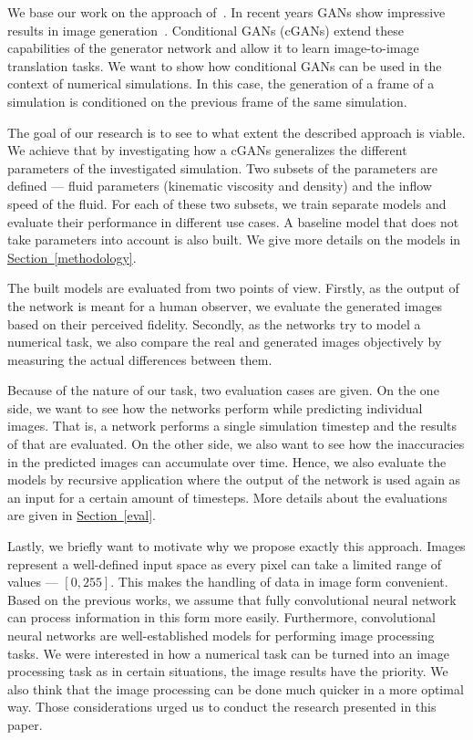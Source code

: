 \documentclass{llncs}
\newcommand{\refsec}[1]{\hyperref[#1]{Section~\ref*{#1}}}
\begin{document}
We base our work on the approach of~\cite{pix2pix}. In recent years GANs show impressive results in image generation~\cite{DashGALA17,ZhangXLZHWM16,karras2017progressive}. Conditional GANs (cGANs) extend these capabilities of the generator network and allow it to learn image-to-image translation tasks. We want to show how conditional GANs can be used in the context of numerical simulations. In this case, the generation of a frame of a simulation is conditioned on the previous frame of the same simulation.

The goal of our research is to see to what extent the described approach is viable. We achieve that by investigating how a cGANs generalizes the different parameters of the investigated simulation. Two subsets of the parameters are defined --- fluid parameters (kinematic viscosity and density) and the inflow speed of the fluid. For each of these two subsets, we train separate models and evaluate their performance in different use cases. A baseline model that does not take parameters into account is also built. We give more details on the models in \refsec{methodology}.

The built models are evaluated from two points of view. Firstly, as the output of the network is meant for a human observer, we evaluate the generated images based on their perceived fidelity. Secondly, as the networks try to model a numerical task, we also compare the real and generated images objectively by measuring the actual differences between them.

Because of the nature of our task, two evaluation cases are given. On the one side, we want to see how the networks perform while predicting individual images. That is, a network performs a single simulation timestep and the results of that are evaluated. On the other side, we also want to see how the inaccuracies in the predicted images can accumulate over time. Hence, we also evaluate the models by recursive application where the output of the network is used again as an input for a certain amount of timesteps. More details about the evaluations are given in \refsec{eval}.

Lastly, we briefly want to motivate why we propose exactly this approach. Images represent a well-defined input space as every pixel can take a limited range of values --- $[0, 255]$. This makes the handling of data in image form convenient. Based on the previous works, we assume that fully convolutional neural network can process information in this form more easily. Furthermore, convolutional neural networks are well-established models for performing image processing tasks. We were interested in how a numerical task can be turned into an image processing task as in certain situations, the image results have the priority. We also think that the image processing can be done much quicker in a more optimal way. Those considerations urged us to conduct the research presented in this paper.
\end{document}
